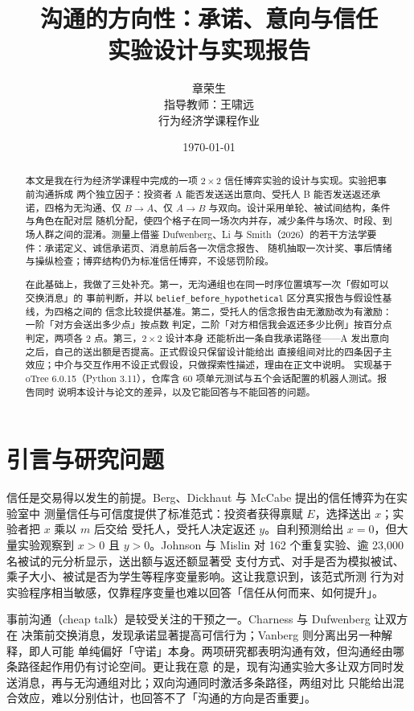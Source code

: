 \documentclass[10pt,a4paper]{ctexart}
\title{\vspace{-1.6em}\bfseries 沟通的方向性：承诺、意向与信任\\[3pt]
\large 实验设计与实现报告}
\author{章荣生\quad 2022621150313\\[2pt]
\small 指导教师：王啸远\\[1pt]
\small 行为经济学课程作业}
\date{\today}
\newcommand{\code}[1]{\texttt{#1}}
\begin{document}
\maketitle

\begin{abstract}
\noindent
本文是我在行为经济学课程中完成的一项 $2\times2$ 信任博弈实验的设计与实现。实验把事前沟通拆成
两个独立因子：投资者 A 能否发送送出意向、受托人 B 能否发送返还承诺，四格为无沟通、仅
$B\!\rightarrow\!A$、仅 $A\!\rightarrow\!B$ 与双向。设计采用单轮、被试间结构，条件与角色在配对层
随机分配，使四个格子在同一场次内并存，减少条件与场次、时段、到场人群之间的混淆。测量上借鉴
Dufwenberg、Li 与 Smith（2026）的若干方法学要件：承诺定义、诚信承诺页、消息前后各一次信念报告、
随机抽取一次计奖、事后情绪与操纵检查；博弈结构仍为标准信任博弈，不设惩罚阶段。

在此基础上，我做了三处补充。第一，无沟通组也在同一时序位置填写一次「假如可以交换消息」的
事前判断，并以 \code{belief\_before\_hypothetical} 区分真实报告与假设性基线，为四格之间的
信念比较提供基准。第二，受托人的信念报告由无激励改为有激励：一阶「对方会送出多少点」按点数
判定，二阶「对方相信我会返还多少比例」按百分点判定，两项各 2 点。第三，$2\times2$ 设计本身
还能析出一条自我承诺路径——A 发出意向之后，自己的送出额是否提高。正式假设只保留设计能给出
直接组间对比的四条因子主效应；中介与交互作用不设正式假设，只做探索性描述，理由在正文中说明。
实现基于 oTree 6.0.15（Python 3.11），仓库含 60 项单元测试与五个会话配置的机器人测试。报告同时
说明本设计与论文的差异，以及它能回答与不能回答的问题。
\end{abstract}

\tableofcontents
\newpage

\section{引言与研究问题}

信任是交易得以发生的前提。Berg、Dickhaut 与 McCabe\cite{berg1995} 提出的信任博弈为在实验室中
测量信任与可信度提供了标准范式：投资者获得禀赋 $E$，选择送出 $x$；实验者把 $x$ 乘以 $m$ 后交给
受托人，受托人决定返还 $y$。自利预测给出 $x=0$，但大量实验观察到 $x>0$ 且 $y>0$。Johnson 与
Mislin\cite{johnson2011} 对 162 个重复实验、逾 23{,}000 名被试的元分析显示，送出额与返还额显著受
支付方式、对手是否为模拟被试、乘子大小、被试是否为学生等程序变量影响。这让我意识到，该范式所测
行为对实验程序相当敏感，仅靠程序变量也难以回答「信任从何而来、如何提升」。

事前沟通（cheap talk）是较受关注的干预之一。Charness 与 Dufwenberg\cite{charness2006} 让双方在
决策前交换消息，发现承诺显著提高可信行为；Vanberg\cite{vanberg2008} 则分离出另一种解释，即人可能
单纯偏好「守诺」本身。两项研究都表明沟通有效，但沟通经由哪条路径起作用仍有讨论空间。更让我在意
的是，现有沟通实验大多让双方同时发送消息，再与无沟通组对比；双向沟通同时激活多条路径，两组对比
只能给出混合效应，难以分别估计，也回答不了「沟通的方向是否重要」。
\end{document}
